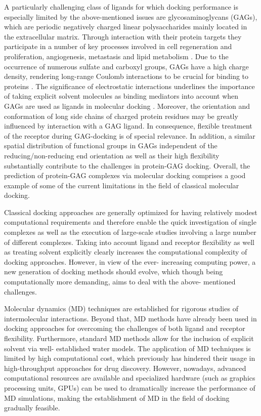 A particularly challenging class of ligands for which docking
performance is especially limited by the above-mentioned issues are
glycosaminoglycans (GAGs), which are periodic negatively charged linear
polysaccharides mainly located in the extracellular matrix. Through interaction
with their protein targets they participate in a number of key processes
involved in cell regeneration and proliferation, angiogenesis, metastasis and
lipid metabolism \cite{hynes_extracellular_2009, macri_growth_2007,
barbero_chembiochem_2013}. Due to the occurrence of numerous sulfate and
carboxyl groups, GAGs have a high charge density, rendering long-range Coulomb
interactions to be crucial for binding to proteins
\cite{mulloy_specificity_2005}. The significance of electrostatic interactions
underlines the importance of taking explicit solvent molecules as binding
mediators into account when GAGs are used as ligands in molecular docking
\cite{samsonov_docking_2011}. Moreover, the orientation and conformation of long
side chains of charged protein residues may be greatly influenced by interaction
with a GAG ligand. In consequence, flexible treatment of the receptor during
GAG-docking is of special relevance. In addition, a similar spatial distribution
of functional groups in GAGs independent of the reducing/non-reducing end
orientation \cite{forster_computational_2006} as well as their high flexibility
\cite{bitomsky_docking_1999} substantially contribute to the challenges in
protein-GAG docking. Overall, the prediction of protein-GAG complexes via
molecular docking comprises a good example of some of the current limitations in
the field of classical molecular docking.

Classical docking approaches are generally optimized for having relatively
modest computational requirements and therefore enable the quick investigation
of single complexes as well as the execution of large-scale studies involving a
large number of different complexes. Taking into account ligand and receptor
flexibility as well as treating solvent explicitly clearly increases the
computational complexity of docking approaches. However, in view of the ever-
increasing computing power, a new generation of docking methods should evolve,
which though being computationally more demanding, aims to deal with the above-
mentioned challenges.

Molecular dynamics (MD) techniques are established for rigorous studies of
intermolecular interactions\cite{karplus_molecular_2005}. Beyond that, MD
methods have already been used in docking approaches for overcoming the
challenges of both ligand and receptor
flexibility\cite{chaudhuri_application_2012, antes_dynadock_2010}. Furthermore,
standard MD methods allow for the inclusion of explicit solvent via well-
established water models. The application of MD techniques is limited by high
computational cost, which previously has hindered their usage in high-throughput
approaches for drug discovery. However, nowadays, advanced computational
resources are available and specialized hardware (such as graphics processing
units, GPUs) can be used to dramatically increase the performance of MD
simulations, making the establishment of MD in the field of docking gradually
feasible.


